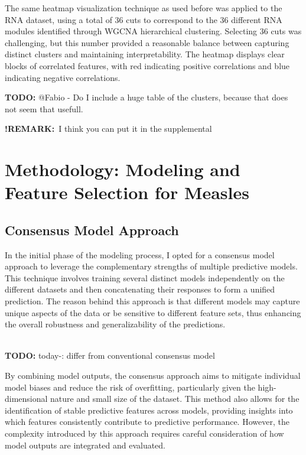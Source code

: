 \documentclass[12pt,a4paper]{report}
\newcommand{\todo}[1]{%
  \par\noindent%
  \begin{tcolorbox}[colback=yellow, colframe=black, boxrule=0.5pt, sharp corners, width=\linewidth, before skip=5pt, after skip=5pt]
    \textbf{TODO:} #1
  \end{tcolorbox}%
  \par
}
\newcommand{\remark}[1]{%
  \par\noindent%
  \begin{tcolorbox}[ colback=orange!20!white, colframe=orange!80!black, boxrule=0.5pt, sharp corners, width=\linewidth, ]
    {\textbf{\textcolor{orange!80!black}!REMARK:}}~#1
  \end{tcolorbox}%
}
\begin{document}
\noindent
The same heatmap visualization technique as used before was applied to the RNA dataset, using a total of 36 cuts to correspond to the 36 different RNA modules identified through WGCNA hierarchical clustering. Selecting 36 cuts was challenging, but this number provided a reasonable balance between capturing distinct clusters and maintaining interpretability. The heatmap displays clear blocks of correlated features, with red indicating positive correlations and blue indicating negative correlations. 
\todo{@Fabio - Do I include a huge table of the clusters, because that does not seem that usefull.}

\remark{I think you can put it in the supplemental}






\chapter{Methodology: Modeling and Feature Selection for Measles}
\section{Consensus Model Approach}
\noindent
In the initial phase of the modeling process, I opted for a consensus model approach to leverage the complementary strengths of multiple predictive models. This technique involves training several distinct models independently on the different datasets and then concatenating their responses to form a unified prediction. The reason behind this approach is that different models may capture unique aspects of the data or be sensitive to different feature sets, thus enhancing the overall robustness and generalizability of the predictions.\\
\\
\todo{today-: differ from conventional consensus model}
By combining model outputs, the consensus approach aims to mitigate individual model biases and reduce the risk of overfitting, particularly given the high-dimensional nature and small size of the dataset. This method also allows for the identification of stable predictive features across models, providing insights into which features consistently contribute to predictive performance. However, the complexity introduced by this approach requires careful consideration of how model outputs are integrated and evaluated. 
\end{document}
